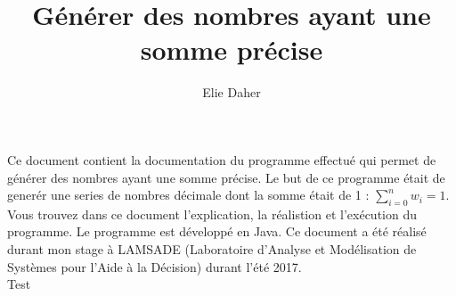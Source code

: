 \documentclass[french]{article}
\title{Générer des nombres ayant une somme précise}
\author{Elie Daher}
\begin{document}
\maketitle
\abstract Ce document contient la documentation du programme effectué qui permet de générer des nombres ayant une somme précise. Le but de ce programme était de generér une series de nombres décimale dont la somme était de 1 : $\sum _{i = 0}^{n} w_i = 1$. Vous trouvez dans ce document l'explication, la réalistion et l'exécution du programme. Le programme est développé en Java. Ce document a été réalisé durant mon stage à LAMSADE (Laboratoire d'Analyse et Modélisation de Systèmes pour l'Aide à la Décision) durant l'été 2017.\\

\newpage
Test
\end{document}
